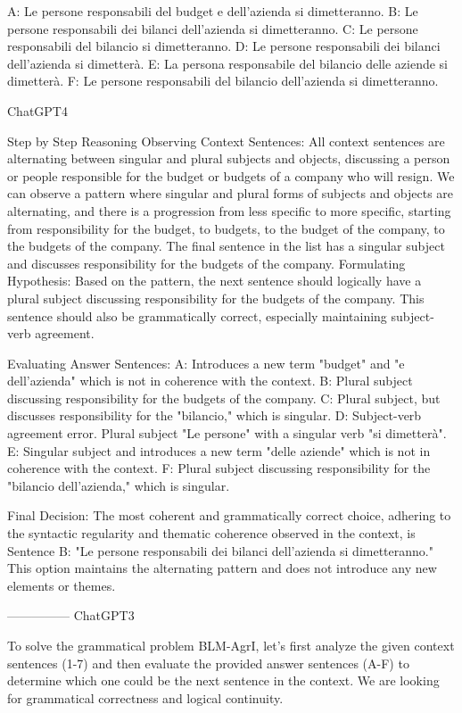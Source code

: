 A: Le persone responsabili del budget e dell'azienda si dimetteranno.
B: Le persone responsabili dei bilanci dell'azienda si dimetteranno.
C: Le persone responsabili del bilancio si dimetteranno.
D: Le persone responsabili dei bilanci dell'azienda si dimetterà.
E: La persona responsabile del bilancio delle aziende si dimetterà.
F: Le persone responsabili del bilancio dell'azienda si dimetteranno.

ChatGPT4

Step by Step Reasoning
Observing Context Sentences:
All context sentences are alternating between singular and plural subjects and objects, discussing a person or people responsible for the budget or budgets of a company who will resign.
We can observe a pattern where singular and plural forms of subjects and objects are alternating, and there is a progression from less specific to more specific, starting from responsibility for the budget, to budgets, to the budget of the company, to the budgets of the company.
The final sentence in the list has a singular subject and discusses responsibility for the budgets of the company.
Formulating Hypothesis:
Based on the pattern, the next sentence should logically have a plural subject discussing responsibility for the budgets of the company. This sentence should also be grammatically correct, especially maintaining subject-verb agreement.

Evaluating Answer Sentences:
A: Introduces a new term "budget" and "e dell'azienda" which is not in coherence with the context.
B: Plural subject discussing responsibility for the budgets of the company.
C: Plural subject, but discusses responsibility for the "bilancio," which is singular.
D: Subject-verb agreement error. Plural subject "Le persone" with a singular verb "si dimetterà".
E: Singular subject and introduces a new term "delle aziende" which is not in coherence with the context.
F: Plural subject discussing responsibility for the "bilancio dell'azienda," which is singular.

Final Decision:
The most coherent and grammatically correct choice, adhering to the syntactic regularity and thematic coherence observed in the context, is Sentence B: "Le persone responsabili dei bilanci dell'azienda si dimetteranno." This option maintains the alternating pattern and does not introduce any new elements or themes.

---------------
ChatGPT3 

To solve the grammatical problem BLM-AgrI, let's first analyze the given context sentences (1-7) and then evaluate the provided answer sentences (A-F) to determine which one could be the next sentence in the context. We are looking for grammatical correctness and logical continuity.

